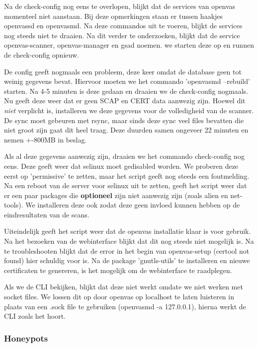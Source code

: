 Na de check-config nog eens te overlopen, blijkt dat de services van openvas momenteel niet aanstaan. Bij deze opmerkingen staan er tussen haakjes openvassd en openvasmd. Na deze commandos uit te voeren, blijkt de services nog steeds niet te draaien. Na dit verder te onderzoeken, blijkt dat de service openvas-scanner, openvas-manager en gsad noemen. we starten deze op en runnen de check-config opnieuw. 

De config geeft nogmaals een probleem, deze keer omdat de database geen tot weinig gegevens bevat. Hiervoor moeten we het commando 'openvasmd --rebuild' starten. Na 4-5 minuten is deze gedaan en draaien we de check-config nogmaals. Nu geeft deze weer dat er geen SCAP en CERT data aanwezig zijn. Hoewel dit \textit{niet} verplicht is, installeren we deze gegevens voor de volledigheid van de scanner. De sync moet gebeuren met rsync, maar sinds deze sync veel files bevatten die niet groot zijn gaat dit heel traag. Deze duurden samen ongeveer 22 minuten en nemen +-800MB in beslag. 

Als al deze gegevens aanwezig zijn, draaien we het commando check-config nog eens. Deze geeft weer dat selinux moet gedisabled worden. We proberen deze eerst op 'permissive' te zetten, maar het script geeft nog steeds een foutmelding. Na een reboot van de server voor selinux uit te zetten, geeft het script weer dat er een paar packages die \textbf{optioneel} zijn niet aanwezig zijn (zoals alien en net-tools). We installeren deze ook zodat deze geen invloed kunnen hebben op de eindresultaten van de scans.

Uiteindelijk geeft het script weer dat de openvas installatie klaar is voor gebruik. Na het bezoeken van de webinterface blijkt dat dit nog steeds niet mogelijk is. Na te troubleshooten blijkt dat de error in het begin van openvas-setup (certool not found) hier schuldig voor is. Na de package 'gnutls-utils' te installeren en nieuwe certificaten te genereren, is het mogelijk om de webinterface te raadplegen. 

Als we de CLI bekijken, blijkt dat deze niet werkt omdate we niet werken met socket files. We lossen dit op door openvas op localhost te laten luisteren in plaats van een .sock file te gebruiken (openvasmd -a 127.0.0.1), hierna werkt de CLI zoals het hoort.

\subsubsection{Honeypots}

